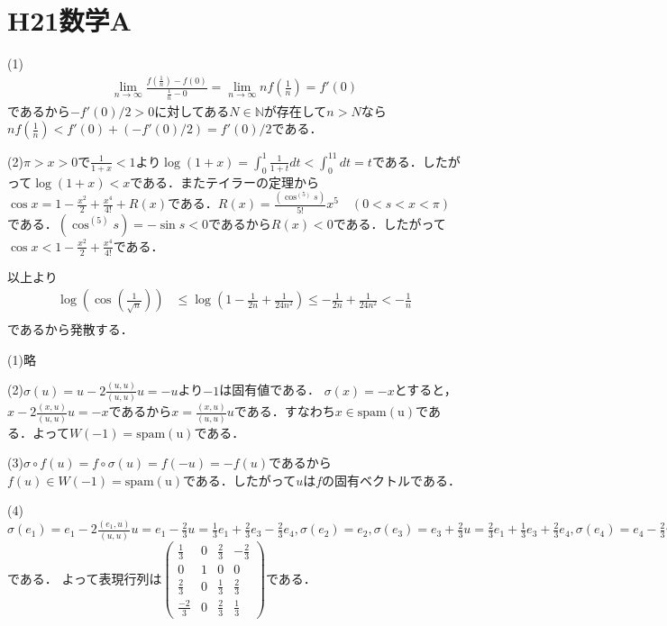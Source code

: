 \documentclass[
		book,
		head_space=20mm,
		foot_space=20mm,
		gutter=10mm,
		line_length=190mm
]{jlreq}
\begin{document}
\section{H21数学A}
(1)
\begin{align}
	\lim\limits_{n\to \infty}\frac{f\left( \frac{1}{n} \right)-f(0)}{\frac{1}{n}-0}=\lim\limits_{n\to \infty}nf\left( \frac{1}{n} \right)=f'(0)
\end{align}であるから$-f'(0)/2>0$に対してある$N \in \mathbb{N}$が存在して$n>N$なら$nf(\frac{1}{n})<f'(0)+(-f'(0)/2)=f'(0)/2$である．

(2)$\pi>x>0$で$\frac{1}{1+x}<1$より$\log(1+x)=\int_0^1\frac{1}{1+t}dt<\int_0^11dt=t$である．したがって$\log(1+x)<x$である．またテイラーの定理から$\cos x=1-\frac{x^2}{2}+\frac{x^4}{4!}+R(x)$である．$R(x)=\frac{(\cos^{(5)}s)}{5!}x^5\quad(0<s<x<\pi)$である．$(\cos^{(5)}s)=-\sin s<0$であるから$R(x)<0$である．したがって$\cos x<1-\frac{x^2}{2}+\frac{x^4}{4!}$である．

以上より \begin{align}
	\log(\cos (\frac{1}{\sqrt{n}}))&\le\log(1-\frac{1}{2n}+\frac{1}{24n^2}) \le-\frac{1}{2n}+\frac{1}{24n^2}<-\frac{1}{n}\\
\end{align}であるから発散する．

(1)略

(2)$\sigma(u)=u-2\frac{(u,u)}{(u,u)}u=-u$より$-1$は固有値である．
$\sigma(x)=-x$とすると，$x-2\frac{(x,u)}{(u,u)}u=-x$であるから$x=\frac{(x,u)}{(u,u)}u$である．すなわち$x \in \mathrm{spam(u)} $である．よって$W(-1)=\mathrm{spam(u)}$である．

(3)$\sigma\circ f(u)=f \circ\sigma(u)=f(-u)=-f(u)$であるから$f(u)\in W(-1)=\mathrm{spam(u)}$である．したがって$u$は$f$の固有ベクトルである．

(4)$\sigma(e_1)=e_1-2\frac{(e_1,u)}{(u,u)}u=e_1-\frac{2}{3}u=\frac{1}{3}e_1+\frac{2}{3}e_3-\frac{2}{3}e_4,\sigma(e_2)=e_2,\sigma(e_3)=e_3+\frac{2}{3}u=\frac{2}{3}e_1+\frac{1}{3}e_3+\frac{2}{3}e_4 ,\sigma(e_4)=e_4-\frac{2}{3}u=-\frac{2}{3}e_1+\frac{2}{3}e_3+\frac{1}{3}e_4$である．
よって表現行列は$\begin{pmatrix}
	\frac{1}{3} & 0 & \frac{2}{3} & -\frac{2}{3} \\
	0 & 1 & 0 & 0 \\
	\frac{2}{3} & 0 & \frac{1}{3} & \frac{2}{3} \\
	\frac{-2}{3} & 0 & \frac{2}{3} & \frac{1}{3}
\end{pmatrix}$である．
\end{document}
